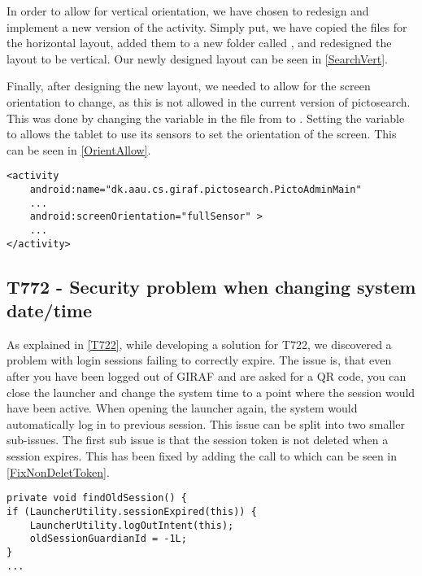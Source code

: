 In order to allow for vertical orientation, we have chosen to redesign and
implement a new version of the activity. Simply put, we have copied the files
for the horizontal layout, added them to a new folder called
, and redesigned the layout to be vertical. Our newly
designed layout can be seen in \autoref{SearchVert}.


Finally, after designing the new layout, we needed to allow for the screen
orientation to change, as this is not allowed in the current version of
pictosearch. This was done by changing the 
variable in the  file from  to
. Setting the variable to  allows the tablet
to use its sensors to set the orientation of the screen. This can be seen in
\autoref{OrientAllow}.\nl

\begin{minipage}[H]{\linewidth}
\begin{lstlisting}[caption = Allowing changes to the screen orientation., label = OrientAllow] 
<activity
	android:name="dk.aau.cs.giraf.pictosearch.PictoAdminMain"
    ...
    android:screenOrientation="fullSensor" >
    ...
</activity>
\end{lstlisting}
\end{minipage}

\subsection{T772 - Security problem when changing system date/time}\label{T772}
As explained in \autoref{T722}, while developing a solution for T722, we
discovered a problem with login sessions failing to correctly expire.
The issue is, that even after you have been logged out of GIRAF and are asked
for a QR code, you can close the launcher and change the system time to a point
where the session would have been active. When opening the launcher again, the
system would automatically log in to previous session. This issue can be split
into two smaller sub-issues. The first sub issue is that the session token is
not deleted when a session expires. This has been fixed by adding the call to
 which can be seen in \autoref{FixNonDeletToken}.\nl

\begin{minipage}[H]{\linewidth}
\begin{lstlisting}[caption = Our solution to not clearing the token, label =
FixNonDeletToken] 
private void findOldSession() {
if (LauncherUtility.sessionExpired(this)) {
	LauncherUtility.logOutIntent(this);
    oldSessionGuardianId = -1L;
}
...
\end{lstlisting} 
\end{minipage}


